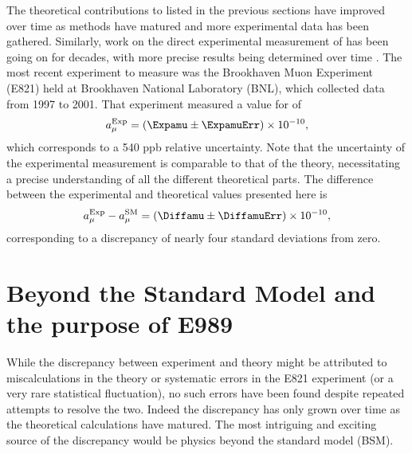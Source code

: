 The theoretical contributions to \amu listed in the previous sections have improved over time as methods have matured and more experimental data has been gathered. Similarly, work on the direct experimental measurement of \amu has been going on for decades, with more precise results being determined over time \cite{PastExperiments}. The most recent experiment to measure \gmtwo was the Brookhaven Muon \gmtwo Experiment (E821) held at Brookhaven National Laboratory (BNL), which collected data from 1997 to 2001. That experiment measured a value for \amu of \cite{E821FinalReport,CODATA}
		\begin{align}
            a_{\mu}^{\text{Exp}} = (\Expamu \pm \ExpamuErr) \times 10^{-10},
		\end{align}
which corresponds to a 540 ppb relative uncertainty. Note that the uncertainty of the experimental measurement is comparable to that of the theory, necessitating a precise understanding of all the different theoretical parts. The difference between the experimental and theoretical values presented here is
		\begin{align}
            a_{\mu}^{\text{Exp}} - a_{\mu}^{\text{SM}} = (\Diffamu \pm \DiffamuErr) \times 10^{-10},
		\end{align}
corresponding to a discrepancy of nearly four standard deviations from zero.



\section{Beyond the Standard Model and the purpose of E989}
\label{sec:BSM}


While the discrepancy between experiment and theory might be attributed to miscalculations in the theory or systematic errors in the E821 experiment (or a very rare statistical fluctuation), no such errors have been found despite repeated attempts to resolve the two. Indeed the discrepancy has only grown over time as the theoretical calculations have matured. The most intriguing and exciting source of the discrepancy would be physics beyond the standard model (BSM). 


